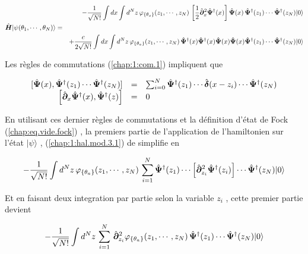 \begin{eqnarray}
	& & - \frac{1}{ \sqrt{N!}} \int dx \int d^N z \, \varphi_{\{\theta_a\}}(z_1, \cdots ,  z_N) \,	\left [\frac{1}{2}\hat{\bm{\partial}}_x^2 \hat{\bm{\Psi}}^\dag(x)\right ] \hat{\bm{\Psi}}(x)\,  \hat{\bm{\Psi}}^\dag(z_1) \cdots \hat{\bm{\Psi}}^\dag(z_N) \vert 0 \rangle \label{chap:1:hal.mod.3.1}\\
	\hat{\bm{H}}\vert \psi ( \theta_1 , \cdots , \theta_N ) \rangle & = & \nonumber \\
	& & +\frac{c}{ 2\sqrt{N!}} \int dx \int d^N z \, \varphi_{\{\theta_a\}}(z_1, \cdots ,  z_N) 	\, \hat{\bm{\Psi}}^\dag(x)\hat{\bm{\Psi}}^\dag(x) \hat{\bm{\Psi}}(x)\hat{\bm{\Psi}}(x)  \hat{\bm{\Psi}}^\dag(z_1) \cdots \hat{\bm{\Psi}}^\dag(z_N) \vert 0 \rangle \label{chap:1:hal.mod.3.1} 
\end{eqnarray}

Les règles de commutations (\ref{chap:1:com.1}) impliquent que 

\begin{eqnarray}
	\left . \begin{array}{rcl}
		[ \hat{\bm{\Psi}}(x),  \hat{\bm{\Psi}}^\dag(z_1)\cdots \hat{\bm{\Psi}}^\dag(z_N)  ]  &=&  \sum_{i = 0}^{N} \hat{\bm{\Psi}}^\dag(z_1) \cdots \hat{\bm{\delta}}(x-z_i) \cdots \hat{\bm{\Psi}}^\dag(z_N)  \\
		\left [ \hat{\bm{\partial}}_x\hat{\bm{\Psi}}^\dag(x),  \hat{\bm{\Psi}}^\dag(z) \right ]   & =  & 0 
	\end{array} \right . \label{chap:1:com.2}
\end{eqnarray}


En utilisant ces dernier règles de commutations et la définition d'état de Fock (\ref{chap:eq.vide.fock}) , la premiers partie de l'application de l'hamiltonien sur l'état $\vert \psi  \rangle$ , (\ref{chap:1:hal.mod.3.1}) de simplifie en 

\begin{eqnarray}
	 - \frac{1}{ \sqrt{N!}} \int d^N z \, \varphi_{\{\theta_a\}}(z_1, \cdots ,  z_N) \,	\sum_{i=1}^N  \hat{\bm{\Psi}}^\dag(z_1) \cdots \left [\hat{\bm{\partial}}_{z_i}^2 \hat{\bm{\Psi}}^\dag(z_i)\right ] \cdots\hat{\bm{\Psi}}^\dag(z_N) \vert 0 \rangle 	
\end{eqnarray}

Et en faisant deux integration par partie selon la variable $z_i$ , cette premier partie devient

\begin{eqnarray}
	 - \frac{1}{ \sqrt{N!}} \int d^N z \, \sum_{i=1}^N \, \hat{\bm{\partial}}_{z_i}^2\varphi_{\{\theta_a\}}(z_1, \cdots ,  z_N) \,	 \hat{\bm{\Psi}}^\dag(z_1)  \cdots\hat{\bm{\Psi}}^\dag(z_N) \vert 0 \rangle \label{chap:1:hal.mod.3.1.1}	
\end{eqnarray}

